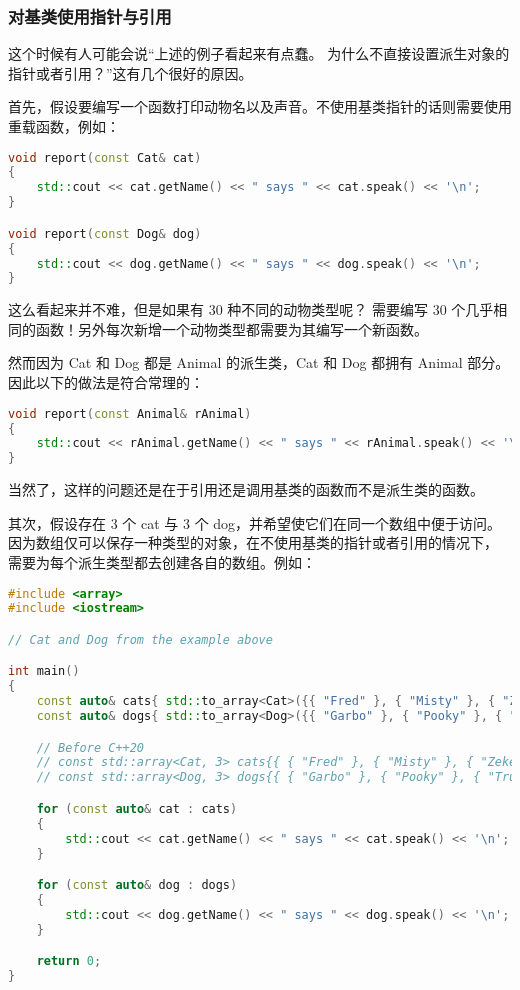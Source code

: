 \documentclass[../../LearnCpp.tex]{subfiles}
\begin{document}
\subsubsection*{对基类使用指针与引用}

这个时候有人可能会说“上述的例子看起来有点蠢。
为什么不直接设置派生对象的指针或者引用？”这有几个很好的原因。

首先，假设要编写一个函数打印动物名以及声音。不使用基类指针的话则需要使用重载函数，例如：

\begin{lstlisting}[language=C++]
void report(const Cat& cat)
{
    std::cout << cat.getName() << " says " << cat.speak() << '\n';
}

void report(const Dog& dog)
{
    std::cout << dog.getName() << " says " << dog.speak() << '\n';
}
\end{lstlisting}

这么看起来并不难，但是如果有 30 种不同的动物类型呢？
需要编写 30 个几乎相同的函数！另外每次新增一个动物类型都需要为其编写一个新函数。

然而因为 Cat 和 Dog 都是 Animal 的派生类，Cat 和 Dog 都拥有 Animal 部分。
因此以下的做法是符合常理的：

\begin{lstlisting}[language=C++]
void report(const Animal& rAnimal)
{
    std::cout << rAnimal.getName() << " says " << rAnimal.speak() << '\n';
}
\end{lstlisting}

当然了，这样的问题还是在于引用还是调用基类的函数而不是派生类的函数。

其次，假设存在 3 个 cat 与 3 个 dog，并希望使它们在同一个数组中便于访问。
因为数组仅可以保存一种类型的对象，在不使用基类的指针或者引用的情况下，
需要为每个派生类型都去创建各自的数组。例如：

\begin{lstlisting}[language=C++]
#include <array>
#include <iostream>

// Cat and Dog from the example above

int main()
{
    const auto& cats{ std::to_array<Cat>({{ "Fred" }, { "Misty" }, { "Zeke" }}) };
    const auto& dogs{ std::to_array<Dog>({{ "Garbo" }, { "Pooky" }, { "Truffle" }}) };

    // Before C++20
    // const std::array<Cat, 3> cats{{ { "Fred" }, { "Misty" }, { "Zeke" } }};
    // const std::array<Dog, 3> dogs{{ { "Garbo" }, { "Pooky" }, { "Truffle" } }};

    for (const auto& cat : cats)
    {
        std::cout << cat.getName() << " says " << cat.speak() << '\n';
    }

    for (const auto& dog : dogs)
    {
        std::cout << dog.getName() << " says " << dog.speak() << '\n';
    }

    return 0;
}
\end{lstlisting}
\end{document}
